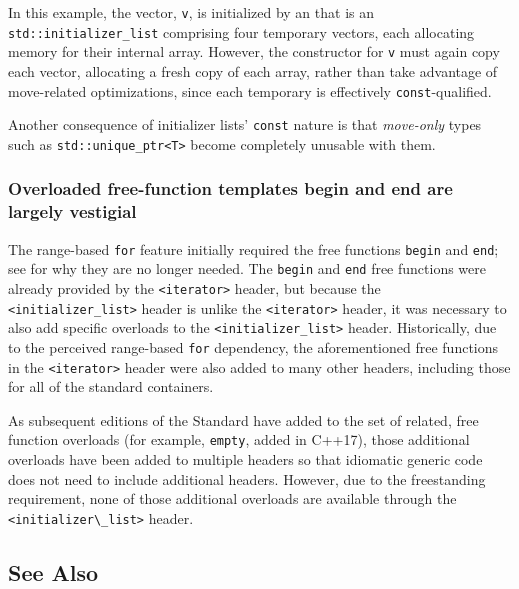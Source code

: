 \noindent In this example, the vector, \lstinline!v!, is initialized by an
 that is an \lstinline!std::initializer_list! comprising four
temporary vectors, each allocating memory for their internal array.
However, the constructor for \lstinline!v! must again copy each vector,
allocating a fresh copy of each array, rather than take advantage of
move-related optimizations, since each temporary is effectively
\lstinline!const!-qualified.

Another consequence of initializer lists' \lstinline!const! nature is that
\emph{move-only} types such as \lstinline!std::unique_ptr<T>! become
completely unusable with them.

\subsubsection[Overloaded free-function templates \lstinline!begin! and \lstinline!end! are largely vestigial]{Overloaded free-function templates {\SubsubsecCode begin} and {\SubsubsecCode end} are largely vestigial}\label{overloaded-free-function-templates-begin-and-end-are-largely-vestigial}

The range-based \lstinline!for! feature initially required the free
functions \lstinline!begin! and \lstinline!end!; see  for why
they are no longer needed. The \lstinline!begin! and \lstinline!end! free
functions were already provided by the \lstinline!<iterator>! header, but
because the \lstinline!<initializer_list>! header is 
unlike the \lstinline!<iterator>! header, it was necessary to also add
specific overloads to the \lstinline!<initializer_list>! header.
Historically, due to the perceived range-based \lstinline!for! dependency,
the aforementioned free functions in the \lstinline!<iterator>! header were
also added to many other headers, including those for all of the
standard containers.

As subsequent editions of the Standard have added to the set of related,
free function overloads (for example, \lstinline!empty!, added in C++17),
those additional overloads have been added to multiple headers so that
idiomatic generic code does not need to include additional headers.
However, due to the freestanding requirement, none of those additional
overloads are available through the \lstinline!<initializer\_list>! header.

\subsection[See Also]{See Also}\label{see-also}

